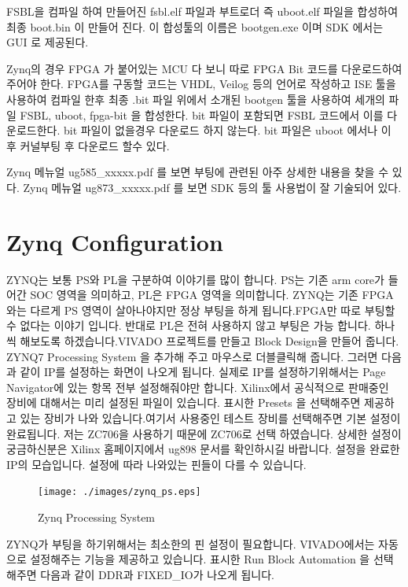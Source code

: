 \documentclass[11pt
  , a4paper
  , article
  , oneside
]{memoir}
\begin{document}
FSBL을 컴파일 하여 만들어진 fsbl.elf 파일과 부트로더 즉 uboot.elf 파일을 합성하여 최종 boot.bin 이 만들어 진다.
이 합성툴의 이름은 bootgen.exe 이며 SDK 에서는 GUI 로 제공된다.

Zynq의 경우 FPGA 가 붙어있는 MCU 다 보니 따로 FPGA Bit 코드를 다운로드하여 주어야 한다.
FPGA를 구동할 코드는 VHDL, Veilog 등의 언어로 작성하고 ISE 툴을 사용하여 컴파일 한후 최종 .bit 파일 위에서 
소개된 bootgen 툴을 사용하여  세개의 파일 FSBL, uboot, fpga-bit 을 합성한다.
bit 파일이 포함되면 FSBL 코드에서 이를 다운로드한다.
bit 파일이 없을경우 다운로드 하지 않는다.
bit 파일은 uboot 에서나 이 후 커널부팅 후 다운로드 할수 있다.

Zynq 메뉴얼 ug585\_xxxxx.pdf 를 보면 부팅에 관련된 아주 상세한 내용을 찾을 수 있다.
Zynq 메뉴얼 ug873\_xxxxx.pdf 를 보면 SDK 등의 툴 사용법이 잘 기술되어 있다.

\section{Zynq Configuration}
ZYNQ는 보통 PS와 PL을 구분하여 이야기를 많이 합니다. PS는 기존 arm core가 들어간 SOC 영역을 의미하고, PL은 FPGA 영역을 의미합니다. ZYNQ는 기존 FPGA와는 다르게 PS 영역이 살아나야지만 정상 부팅을 하게 됩니다.FPGA만 따로 부팅할 수 없다는 이야기 입니다. 반대로 PL은 전혀 사용하지 않고 부팅은 가능 합니다. 하나씩 해보도록 하겠습니다.VIVADO 프로젝트를 만들고 Block Design을 만들어 줍니다. ZYNQ7 Processing System 을 추가해 주고 마우스로 더블클릭해 줍니다. 그러면 다음과 같이 IP를 설정하는 화면이 나오게 됩니다. 실제로 IP를 설정하기위해서는 Page Navigator에 있는 항목 전부 설정해줘야만 합니다. Xilinx에서 공식적으로 판매중인 장비에 대해서는 미리 설정된 파일이 있습니다. 표시한 Presets 을 선택해주면 제공하고 있는 장비가 나와 있습니다.여기서 사용중인 테스트 장비를 선택해주면 기본 설정이 완료됩니다. 저는 ZC706을 사용하기 때문에 ZC706로 선택 하였습니다. 상세한 설정이 궁금하신분은 Xilinx 홈페이지에서 ug898 문서를 확인하시길 바랍니다. 설정을 완료한 IP의 모습입니다. 설정에 따라 나와있는 핀들이 다를 수 있습니다.

\begin{figure}[h!]
	\centering
	\texttt{[image: ./images/zynq\_ps.eps]}
	\caption{Zynq Processing System}
	\label{fig:zynq_ps} 
\end{figure}

ZYNQ가 부팅을 하기위해서는 최소한의 핀 설정이 필요합니다. VIVADO에서는 자동으로 설정해주는 기능을 제공하고 있습니다.
표시한 Run Block Automation 을 선택 해주면 다음과 같이 DDR과 FIXED\_IO가 나오게 됩니다. 
\end{document}
